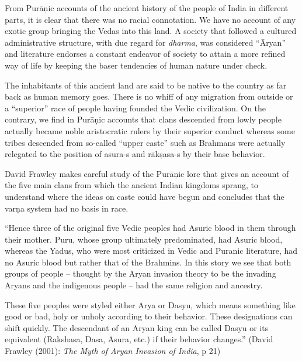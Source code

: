 From Purāņic accounts of the ancient history of the people of India in different parts, it is clear that there was no racial connotation. We have no account of any exotic group bringing the Vedas into this land. A society that followed a cultured administrative structure, with due regard for \textit{dharma}, was considered “Āryan” and literature endorses a constant endeavor of society to attain a more refined way of life by keeping the baser tendencies of human nature under check.

The inhabitants of this ancient land are said to be native to the country as far back as human memory goes. There is no whiff of any migration from outside or a “superior” race of people having founded the Vedic civilization. On the contrary, we find in Purāņic accounts that clans descended from lowly people actually became noble aristocratic rulers by their superior conduct whereas some tribes descended from so-called “upper caste” such as Brahmans were actually relegated to the position of asura-s and rākṣasa-s by their base behavior.

David Frawley makes careful study of the Purāņic lore that gives an account of the five main clans from which the ancient Indian kingdoms sprang, to understand where the ideas on caste could have begun and concludes that the varņa system had no basis in race.

\begin{myquote}
“Hence three of the original five Vedic peoples had Asuric blood in them through their mother. Puru, whose group ultimately predominated, had Asuric blood, whereas the Yadus, who were most criticized in Vedic and Puranic literature, had no Asuric blood but rather that of the Brahmins. In this story we see that both groups of people – thought by the Aryan invasion theory to be the invading Aryans and the indigenous people – had the same religion and ancestry.
\end{myquote}

\begin{myquote}
These five peoples were styled either Arya or Dasyu, which means something like good or bad, holy or unholy according to their behavior. These designations can shift quickly. The descendant of an Aryan king can be called Dasyu or its equivalent (Rakshasa, Dasa, Asura, etc.) if their behavior changes.” (David Frawley (2001): \textit{The Myth of Aryan Invasion of India}, p 21)
\end{myquote}

